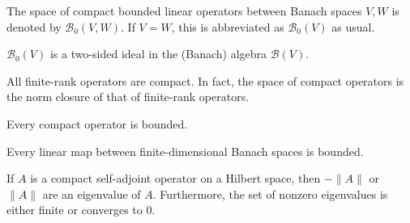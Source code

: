 

    \begin{notation}
        The space of compact bounded linear operators between Banach spaces $V,W$ is denoted by $\mathcal{B}_0(V,W)$. If $V=W$, this is abbreviated as $\mathcal{B}_0(V)$ as usual.
    \end{notation}
    \begin{property}
        $\mathcal{B}_0(V)$ is a two-sided ideal in the (Banach) algebra $\mathcal{B}(V)$.
    \end{property}

    \begin{property}
        All finite-rank operators are compact. In fact, the space of compact operators is the norm closure of that of finite-rank operators.
    \end{property}

    \begin{property}
        Every compact operator is bounded.
    \end{property}
    \begin{result}
        Every linear map between finite-dimensional Banach spaces is bounded.
    \end{result}

    \begin{property}
        If $A$ is a compact self-adjoint operator on a Hilbert space, then $-\|A\|$ or $\|A\|$ are an eigenvalue of $A$. Furthermore, the set of nonzero eigenvalues is either finite or converges to 0.
    \end{property}


